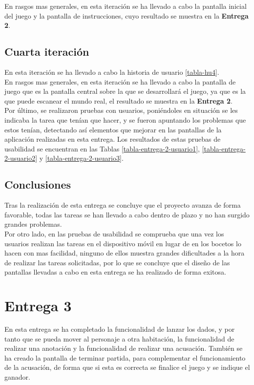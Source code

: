 En rasgos mas generales, en esta iteración se ha llevado a cabo la pantalla inicial del juego y la pantalla de instrucciones, cuyo resultado se muestra en la \textbf{Entrega 2}.


\subsection{Cuarta iteración}
En esta iteración se ha llevado a cabo la historia de usuario \ref{tabla-hu4}.\\

En rasgos mas generales, en esta iteración se ha llevado a cabo la pantalla de juego que es la pantalla central sobre la que se desarrollará el juego, ya que es la que puede escanear el mundo real, el resultado se muestra en la \textbf{Entrega 2}.\\

Por último, se realizaron pruebas con usuarios, poniéndoles en situación se les indicaba la tarea que tenían que hacer, y se fueron apuntando los problemas que estos tenían, detectando así elementos que mejorar en las pantallas de la aplicación realizadas en esta entrega. Los resultados de estas pruebas de usabilidad se encuentran en las Tablas \ref{tabla-entrega-2-usuario1}, \ref{tabla-entrega-2-usuario2} y \ref{tabla-entrega-2-usuario3}.

\subsection{Conclusiones}
Tras la realización de esta entrega se concluye que el proyecto avanza de forma favorable, todas las tareas se han llevado a cabo dentro de plazo y no han surgido grandes problemas.\\

Por otro lado, en las pruebas de usabilidad se comprueba que una vez los usuarios realizan las tareas en el dispositivo móvil en lugar de en los bocetos lo hacen con mas facilidad, ninguno de ellos muestra grandes dificultades a la hora de realizar las tareas solicitadas, por lo que se concluye que el diseño de las pantallas llevadas a cabo en esta entrega se ha realizado de forma exitosa.

\section{Entrega 3}
En esta entrega se ha completado la funcionalidad de lanzar los dados, y por tanto que se pueda mover al personaje a otra habitación, la funcionalidad de realizar una anotación y la funcionalidad de realizar una acusación. También se ha creado la pantalla de terminar partida, para complementar el funcionamiento de la acusación, de forma que si esta es correcta se finalice el juego y se indique el ganador.\\

